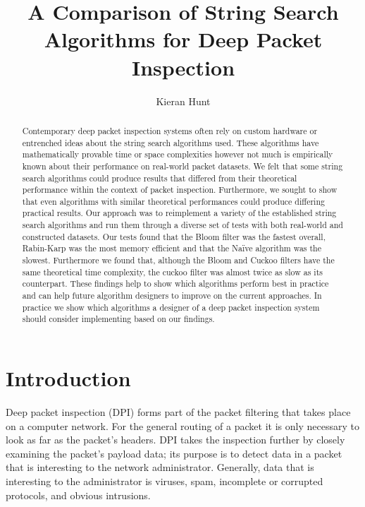 \documentclass{article}
\begin{document}
\title{A Comparison of String Search Algorithms for Deep Packet Inspection}
\author{Kieran Hunt}

\maketitle

\begin{abstract}
Contemporary deep packet inspection systems often rely on custom hardware or entrenched ideas about the string search algorithms used. These algorithms have mathematically provable time or space complexities however not much is empirically known about their performance on real-world packet datasets. We felt that some string search algorithms could produce results that differed from their theoretical performance within the context of packet inspection. Furthermore, we sought to show that even algorithms with similar theoretical performances could produce differing practical results. Our approach was to reimplement a variety of the established string search algorithms and run them through a diverse set of tests with both real-world and constructed datasets. Our tests found that the Bloom filter was the fastest overall, Rabin-Karp was the most memory efficient and that the Naïve algorithm was the slowest. Furthermore we found that, although the Bloom and Cuckoo filters have the same theoretical time complexity, the cuckoo filter was almost twice as slow as its counterpart. These findings help to show which algorithms perform best in practice and can help future algorithm designers to improve on the current approaches. In practice we show which algorithms a designer of a deep packet inspection system should consider implementing based on our findings.
\end{abstract}

\tableofcontents

\section{Introduction}
Deep packet inspection (DPI) forms part of the packet filtering that takes place on a computer network. For the general routing of a packet it is only necessary to look as far as the packet's headers. DPI takes the inspection further by closely examining the packet's payload data; its purpose is to detect data in a packet that is interesting to the network administrator. Generally, data that is interesting to the administrator is viruses, spam, incomplete or corrupted protocols, and obvious intrusions.
\end{document}
